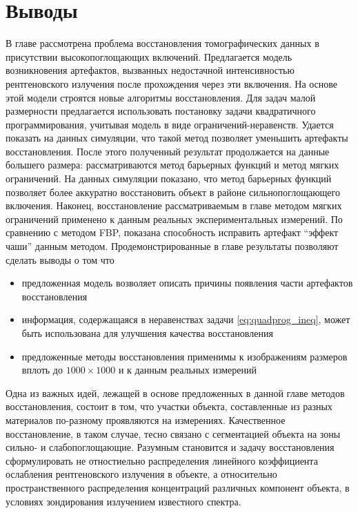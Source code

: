 \section{Выводы}
В главе рассмотрена проблема восстановления томографических данных в присутствии высокопоглощающих включений.
Предлагается модель возникновения артефактов, вызванных недостачной интенсивностью рентгеновского излучения после прохождения через эти включения.
На основе этой модели строятся новые алгоритмы восстановления.
Для задач малой размерности предлагается использовать постановку задачи квадратичного программирования, учитывая модель в виде ограничений-неравенств.
Удается показать на данных симуляции, что такой метод позволяет уменьшить артефакты восстановления.
После этого полученный результат продолжается на данные большего размера: рассматриваются метод барьерных функций и метод мягких ограничений.
На данных симуляции показано, что метод барьерных функций позволяет более аккуратно восстановить объект в районе сильнопоглощающего включения.
Наконец, восстановление рассматриваемым в главе методом мягких ограничений применено к данным реальных экспериментальных измерений.
По сравнению с методом FBP, показана способность исправить артефакт ``эффект чаши'' данным методом.
Продемонстрированные в главе результаты позволяют сделать выводы о том что

\begin{itemize}
  \item предложенная модель возволяет описать причины появления части артефактов восстановления
  \item информация, содержащаяся в неравенствах задачи \eqref{eq:quadprog_ineq}, может быть использована для улучшения качества восстановления
  \item предложенные методы восстановления применимы к изображениям размеров вплоть до $1000 \times 1000$ и к данным реальных измерений
\end{itemize}

Одна из важных идей, лежащей в основе предложенных в данной главе методов восстановления, состоит в том, что участки объекта, составленные из разных материалов по-разному проявляются на измерениях.
Качественное восстановление, в таком случае, тесно связано с сегментацией объекта на зоны сильно- и слабопоглощающие.
Разумным становится и задачу восстановления сформулировать не отностиельно распределения линейного коэффициента ослабления рентгеновского излучения в объекте, а относительно пространственного распределения концентраций различных компонент объекта, в условиях зондирования излучением известного спектра.

